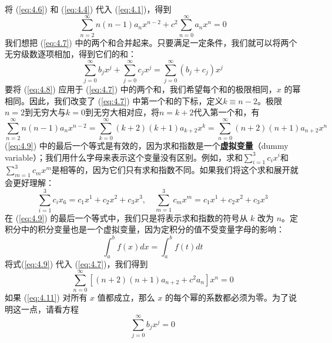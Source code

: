     将 (\ref{eq:4.6}) 和 (\ref{eq:4.4}) 代入 (\ref{eq:4.1})，得到
    \begin{equation}
        \sum_{n=2}^{\infty}n(n-1)a_nx^{n-2} + c^2\sum_{n=0}^{\infty}a_nx^n = 0
        \label{eq:4.7}
    \end{equation}
    我们想把 (\ref{eq:4.7}) 中的两个和合并起来。只要满足一定条件，我们就可以将两个无穷级数逐项相加，得到它们的和：
    \begin{equation}
        \sum_{j=0}^{\infty}b_jx^j + \sum_{j=0}^{\infty}c_jx^j = \sum_{j=0}^{\infty}(b_j+c_j)x^j
        \label{eq:4.8}
    \end{equation}
    要将 (\ref{eq:4.8}) 应用于 (\ref{eq:4.7}) 中的两个和，我们希望每个和的极限相同，$x$ 的幂相同。因此，我们改变了 (\ref{eq:4.7}) 中第一个和的下标，定义$k \equiv n-2$。极限$n = 2$到无穷大与$k = 0$到无穷大相对应，将$n=k+2$代入第一个和，有
    \begin{equation}
        \sum_{n=2}^{\infty}n\left(n-1\right)a_nx^{n-2} = \sum_{k=0}^{\infty}\left(k+2\right)\left(k+1\right)a_{k+2}x^k = \sum_{n=0}^{\infty}\left(n+2\right)\left(n+1\right)a_{n+2}x^n
        \label{eq:4.9}
    \end{equation}
    (\ref{eq:4.9}) 中的最后一个等式是有效的，因为求和指数是一个\textbf{虚拟变量}（dummy variable）；我们用什么字母来表示这个变量没有区别。例如，求和$\sum_{i=1}^{3}c_ix^i$和$\sum_{m=1}^{3}c_mx^m$是相等的，因为它们只有求和指数不同。如果我们将这个求和展开就会更好理解：
    \begin{equation*}
        \sum_{i=1}^{3}c_ix_6 = c_1x^1 + c_2x^2 + c_3x^3, \quad \sum_{m=1}^{3}c_mx^m = c_1x^1 + c_2x^2 + c_3x^3
    \end{equation*}
    在 (\ref{eq:4.9}) 的最后一个等式中，我们只是将表示求和指数的符号从 $k$ 改为 $n$。定积分中的积分变量也是一个虚拟变量，因为定积分的值不受变量字母的影响：
    \begin{equation}
        \int_{a}^{b}f\left(x\right)dx = \int_{a}^{b}f\left(t\right)dt
        \label{eq:4.10}
    \end{equation}
    将式(\ref{eq:4.9}) 代入 (\ref{eq:4.7})，我们得到
    \begin{equation}
        \sum_{n=0}^{\infty}\left[\left(n+2\right)\left(n+1\right)a_{n+2}+c^2a_n\right]x^n = 0
        \label{eq:4.11}
    \end{equation}
    如果 (\ref{eq:4.11}) 对所有 $x$ 值都成立，那么 $x$ 的每个幂的系数都必须为零。为了说明这一点，请看方程
    \begin{equation}
        \sum_{j=0}^{\infty}b_jx^j = 0
        \label{eq:4.12}
    \end{equation}

